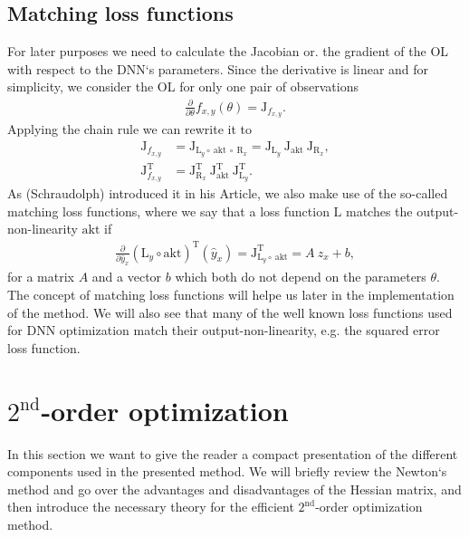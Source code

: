 \documentclass[conference]{IEEEtran}
\begin{document}
\subsection{Matching loss functions}
For later purposes we need to calculate the Jacobian or. the gradient of the OL with respect to the DNN`s parameters. Since the derivative is linear and for simplicity, we consider the OL for only one pair of observations
\begin{align}
\frac{\partial}{\partial\theta}f_{x, y}(\theta) = \mathrm{J}_{f_{x, y}}.
\end{align}
Applying the chain rule we can rewrite it to
\begin{align}
\mathrm{J}_{f_{x, y}} &= \mathrm{J}_{\mathrm{L}_{y}\circ \:\text{akt} \:\circ\:\mathrm{R}_{x}} = \mathrm{J}_{\mathrm{L}_{y}} \: \mathrm{J}_{\text{akt}} \: \mathrm{J}_{\mathrm{R}_{x}},\\
\mathrm{J}_{f_{x, y}}^{\mathrm{T}} &= \mathrm{J}_{\mathrm{R}_{x}}^{\mathrm{T}} \: \mathrm{J}_{\text{akt}}^{\mathrm{T}} \: \mathrm{J}_{\mathrm{L}_{y}}^{\mathrm{T}}.
\end{align}
As (Schraudolph) introduced it in his Article, we also make use of the so-called matching loss functions, where we say that a loss function $\mathrm{L}$ matches the output-non-linearity $\text{akt}$ if
\begin{align}
\frac{\partial}{\partial\hat{y}_{x}}\left(\mathrm{L}_{y}\circ \text{akt}\right)^{\mathrm{T}}(\hat{y}_{x})= \mathrm{J}_{\mathrm{L}_{y}\circ \:\text{akt}}^{\mathrm{T}} = A\: z_{x} + b,
\end{align}
for a matrix $A$ and a vector $b$ which both do not depend on the parameters $\theta$.
The concept of matching loss functions will helpe us later in the implementation of the method. We will also see that many of the well known loss functions used for DNN optimization match their output-non-linearity, e.g. the squared error loss function.


\section{$2^{\text{nd}}$-order optimization}
In this section we want to give the reader a compact presentation of the different components used in the presented method. We will briefly review the Newton`s method and go over the advantages and disadvantages of the Hessian matrix, and then introduce the necessary theory for the efficient $2^{\text{nd}}$-order optimization method.
\end{document}
